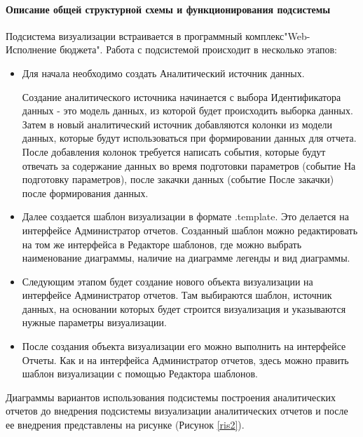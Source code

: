 \documentclass[a4paper]{extarticle}
\numberwithin{equation}{section}
\begin{document}
\paragraph{Описание общей структурной схемы и функционирования подсистемы}
Подсистема визуализации встраивается в программный комплекс\newline "Web-Исполнение бюджета". Работа с подсистемой происходит в несколько этапов:\par
\begin{itemize}
	\item Для начала необходимо создать Аналитический источник данных.\par
  Создание аналитического источника начинается с выбора Идентификатора данных - это модель данных, из которой будет происходить выборка данных. Затем в новый аналитический источник добавляются колонки из модели данных, которые будут использоваться при формировании данных для отчета. После добавления колонок требуется написать события, которые будут отвечать за содержание данных во время подготовки параметров (событие На подготовку параметров), после закачки данных (событие После закачки) после формирования данных.
	\item Далее создается шаблон визуализации в формате .template. Это делается на интерфейсе Администратор отчетов.
  Созданный шаблон можно редактировать на том же интерфейса в Редакторе шаблонов, где можно выбрать наименование диаграммы, наличие на диаграмме легенды и вид диаграммы.
    \item Следующим этапом будет создание нового объекта визуализации на интерфейсе Администратор отчетов. Там выбираются шаблон, источник данных, на основании которых будет строится визуализация и указываются нужные параметры визуализации.
    \item После создания объекта визуализации его можно выполнить на интерфейсе Отчеты. Как и на интерфейса Администратор отчетов, здесь можно править шаблон визуализации с помощью Редактора шаблонов.
\end{itemize}\par
Диаграммы вариантов использования подсистемы построения аналитических отчетов до внедрения подсистемы визуализации аналитических отчетов и после ее внедрения представлены на рисунке (Рисунок \ref{ris2}).
\end{document}
